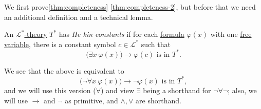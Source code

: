 We first prove\autoref{thm:completeness} \autoref{thm:completeness-2}, but before that we need an additional definition and a technical lemma.

\begin{definition}\label{def:Henkin-constant}
	An \hyperref[def:theory]{\(\mathcal{L} ^{\ast} \)-theory} \(T^{\ast} \) has \emph{He kin constants} if for each \hyperref[def:formula]{formula} \(\varphi (x)\) with one \hyperref[def:free-variable]{free variable}, there is a constant symbol \(c\in \mathcal{L} ^{\ast} \) such that
	\[
		\big( \exists x\ \varphi (x)\big) \to \varphi (c) \text{ is in \(T^{\ast} \)}.
	\]
\end{definition}
We see that the above is equivalent to
\[
	\big( \lnot \forall x\ \varphi (x)\big) \to  \lnot \varphi (x) \text{ is in \(T^{\ast} \)},
\]
and we will use this version (\(\forall \)) and view \(\exists \) being a shorthand for \(\lnot \forall \lnot \); also, we will use \(\to \) and \(\lnot \) as primitive, and \(\land , \lor \) are shorthand.

